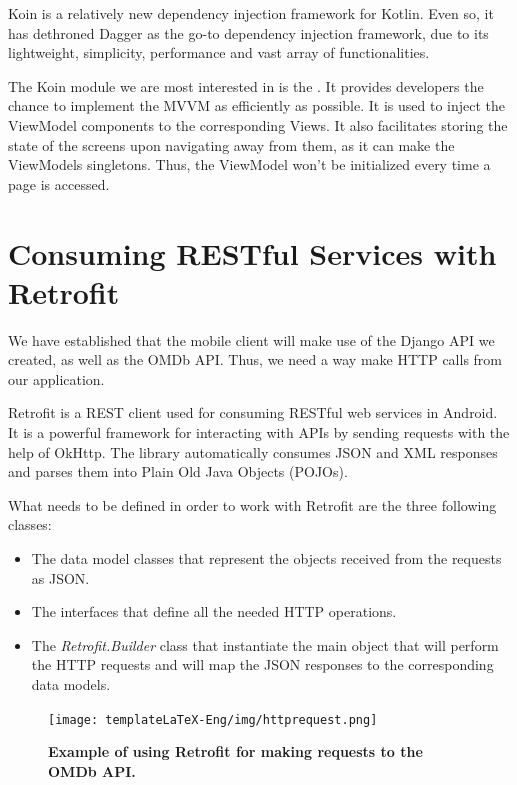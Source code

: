 \documentclass[12pt,a4paper,twoside]{report}
\begin{document}
Koin is a relatively new dependency injection framework for Kotlin. Even so, it has dethroned Dagger as the go-to dependency injection framework, due to its lightweight, simplicity, performance and vast array of functionalities. 

The Koin module we are most interested in is the . It provides developers the chance to implement the MVVM as efficiently as possible. It is used to inject the ViewModel components to the corresponding Views. It also facilitates storing the state of the screens upon navigating away from them, as it can make the ViewModels singletons. Thus, the ViewModel won't be initialized every time a page is accessed. 


\section{Consuming RESTful Services with Retrofit}
We have established that the mobile client will make use of the Django API we created, as well as the OMDb API. Thus, we need a way make HTTP calls from our application.

Retrofit is a REST client used for consuming RESTful web services in Android. It is a powerful framework for interacting with APIs by sending requests with the help of OkHttp. The library automatically consumes JSON and XML responses and parses them into Plain Old Java Objects (POJOs).

What needs to be defined in order to work with Retrofit are the three following classes:
\begin{itemize}
    \item The data model classes that represent the objects received from the requests as JSON.
    \item The interfaces that define all the needed HTTP operations.
    \item The \textit{Retrofit.Builder} class that instantiate the main object that will perform the HTTP requests and will map the JSON responses to the corresponding data models. 
\end{itemize}

 \begin{figure}[H]
    \begin{center}
        \texttt{[image: templateLaTeX-Eng/img/httprequest.png]}
        \caption{\bf Example of using Retrofit for making requests to the OMDb API.}
    \end{center}
\end{figure}
\end{document}
